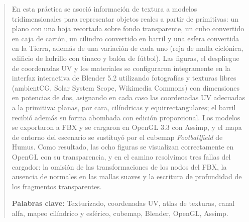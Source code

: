 
\begin{abstract}
En esta práctica se asoció información de textura a modelos tridimensionales para representar objetos reales a partir de primitivas: un plano con una hoja recortada sobre fondo transparente, un cubo convertido en caja de cartón, un cilindro convertido en barril y una esfera convertida en la Tierra, además de una variación de cada uno (reja de malla ciclónica, edificio de ladrillo con tinaco y balón de fútbol). Las figuras, el despliegue de coordenadas UV y los materiales se configuraron íntegramente en la interfaz interactiva de Blender 5.2 utilizando fotografías y texturas libres (ambientCG, Solar System Scope, Wikimedia Commons) con dimensiones en potencias de dos, asignando en cada caso las coordenadas UV adecuadas a la primitiva: planas, por cara, cilíndricas y equirrectangulares; el barril recibió además su forma abombada con edición proporcional. Los modelos se exportaron a FBX y se cargaron en OpenGL 3.3 con Assimp, y el mapa de entorno del escenario se sustituyó por el cubemap \textit{Footballfield} de Humus. Como resultado, las ocho figuras se visualizan correctamente en OpenGL con su transparencia, y en el camino resolvimos tres fallas del cargador: la omisión de las transformaciones de los nodos del FBX, la ausencia de normales en las mallas suaves y la escritura de profundidad de los fragmentos transparentes.

\vspace{0.3cm}
\noindent\textbf{Palabras clave:} Texturizado, coordenadas UV, atlas de texturas, canal alfa, mapeo cilíndrico y esférico, cubemap, Blender, OpenGL, Assimp.
\end{abstract}

\vspace{0.5cm}


